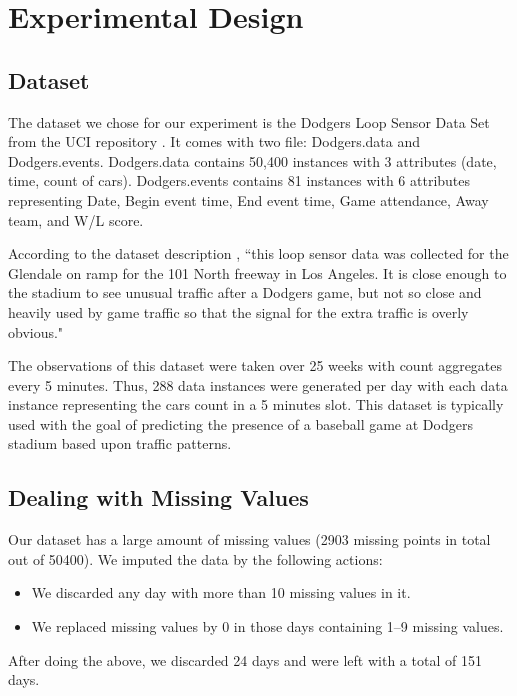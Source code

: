 \documentclass[conference]{IEEEtran}
\begin{document}
		
		\section{Experimental Design}
		\label{sec:experimental-design}
		\subsection{Dataset}
		The dataset we chose for our experiment is the Dodgers Loop Sensor Data Set from the UCI repository \cite{dataset}. It comes with two file: Dodgers.data and Dodgers.events. Dodgers.data contains 50,400 instances with 3 attributes (date, time, count of cars). Dodgers.events contains 81 instances with 6 attributes representing  Date, Begin event time, End event time, Game attendance, Away team, and W/L score. 
		
		According to the dataset description \cite{dataset}, ``this loop sensor data was collected for the Glendale on ramp for the 101 North freeway in Los Angeles. It is close enough to the stadium to see unusual traffic after a Dodgers game, but not so close and heavily used by game traffic so that the signal for the extra traffic is overly obvious." 
		
		The observations of this dataset were taken over 25 weeks with count aggregates every 5 minutes. Thus, 288 data instances were generated per day with each data instance representing the cars count in a 5 minutes slot. This dataset is typically used with the goal of predicting the presence of a baseball game at Dodgers stadium based upon traffic patterns. 
		
		\subsection{Dealing with Missing Values}
		\label{sec:missing-values}
		
		Our dataset has a large amount of missing values (2903 missing points in total out of 50400). We imputed the data by the following actions:
		\begin{itemize}
			\item We discarded any day with more than 10 missing values in it.
			\item We replaced missing values by 0 in those days containing 1--9 missing values.
		\end{itemize}
		After doing the above, we discarded 24 days and were left with a total of 151 days. 
		
\end{document}
